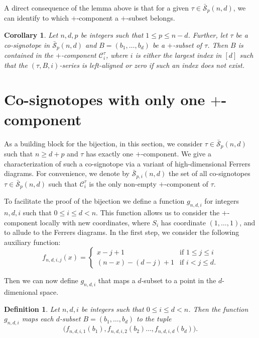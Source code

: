 \documentclass[a4paper,11pt]{amsart}
\newtheorem{corollary}[theorem]{Corollary}
\newtheorem{definition}[theorem]{Definition}
\newcommand{\C}{\mathcal{C}}
\newcommand{\calS}{\mathcal{S}}
\begin{document}
A direct consequence of the lemma above is that for a given $\tau \in \bar{\calS}_{p}(n,d)$, we can identify to which $+$-component a $+$-subset belongs. 

\begin{corollary}
\label{lem:which_component}
    Let $n,d,p$ be integers such that $1 \leq p \leq n-d$.
    Further, let $\tau$ be a co-signotope in $\bar{\calS}_{p}(n,d)$ and $B = (b_1, \dots, b_d)$ be a $+$-subset of $\tau$.
    Then $B$ is contained in the $+$-component $\C^{\tau}_i$, where $i$ is either the largest index in $[d]$ such that the $(\tau,B,i)$-series is left-aligned or zero if such an index does not exist.
\end{corollary}

\section{Co-signotopes with only one $+$-component}
\label{sec:onepluscomponent}

As a building block for the bijection, in this section, we consider $\tau \in \bar{\calS}_p(n,d)$ such that $n \geq d+p$ and $\tau$ has exactly one $+$-component.
We give a characterization of such a co-signotope via a variant of high-dimensional Ferrers diagrams.
For convenience, we denote by $\bar{\calS}_{p,i}(n,d)$ the set of all co-signotopes $\tau \in \bar{\calS}_p(n,d)$ such that $\C^{\tau}_i$ is the only non-empty $+$-component of $\tau$.

To facilitate the proof of the bijection we define a function $g_{n,d,i}$ for integers $n,d,i$ such that $0 \leq i \leq d < n$. This function allows us to consider the $+$-component locally with new coordinates, where $S_i$ has coordinate $(1,\ldots, 1)$, and to allude to the Ferrers diagrams.
In the first step, we consider the following auxiliary function:
\[
	f_{n,d,i,j}(x) =
	\begin{cases}
		x - j + 1& \text{if } 1 \leq j \leq i \\
		(n - x) - (d - j) + 1 & \text{if } i < j \leq d.
	\end{cases}
\]

Then we can now define $g_{n,d,i}$ that maps a $d$-subset to a point in the $d$-dimenional space.
\begin{definition}
\label{def:g}
    Let $n,d,i$ be integers such that $0 \leq i \leq d < n$.
    Then the function $g_{n,d,i}$ maps each $d$-subset $B = (b_1, \dots, b_d)$ to the tuple 
    \[
        \big(f_{n,d,i,1}(b_1), f_{n,d,i,2}(b_2) \dots, f_{n,d,i,d}(b_d)\big).
    \]
\end{definition}
\end{document}
